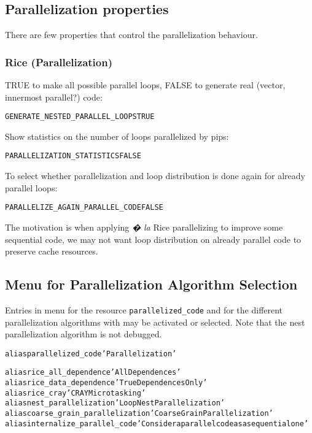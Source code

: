 \documentclass[a4paper]{report}
\newenvironment{PipsProp}{\begin{alltt}}{\end{alltt}}
\newenvironment{PipsMake}{\begin{alltt}}{\end{alltt}}
\begin{document}
\subsection{Parallelization properties}


There are few properties that control the parallelization behaviour.

\subsubsection{Rice (Parallelization)}

TRUE to make all possible parallel loops, FALSE to generate real (vector,
innermost parallel?) code:
\begin{PipsProp}
GENERATE_NESTED_PARALLEL_LOOPS TRUE
\end{PipsProp}

Show statistics on the number of loops parallelized by pips:
\begin{PipsProp}
PARALLELIZATION_STATISTICS FALSE
\end{PipsProp}


To select whether parallelization and loop distribution is done again for
already parallel loops:
\begin{PipsProp}
PARALLELIZE_AGAIN_PARALLEL_CODE FALSE
\end{PipsProp}
The motivation is when applying \emph{� la} Rice parallelizing to improve
some sequential code, we may not want loop distribution on already
parallel code to preserve cache resources.


\subsection{Menu for Parallelization Algorithm Selection}

Entries in menu for the resource \verb/parallelized_code/ and for the
different parallelization algorithms with may be activated or
selected. Note that the nest parallelization algorithm is not debugged.

\begin{PipsMake}
alias parallelized_code 'Parallelization'

alias rice_all_dependence 'All Dependences'
alias rice_data_dependence 'True Dependences Only'
alias rice_cray 'CRAY Microtasking'
alias nest_parallelization 'Loop Nest Parallelization'
alias coarse_grain_parallelization 'Coarse Grain Parallelization'
alias internalize_parallel_code 'Consider a parallel code as a sequential one'
\end{PipsMake}
\end{document}
